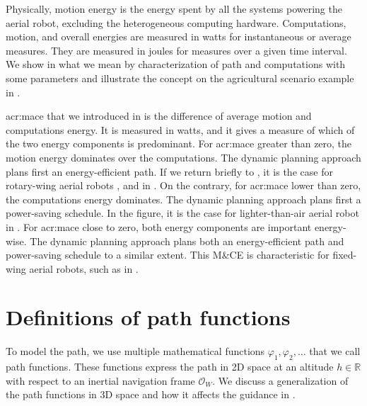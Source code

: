 Physically, motion energy is the energy spent by all the systems powering the aerial robot, excluding the heterogeneous computing hardware. Computations, motion, and overall energies are measured in watts for instantaneous or average measures. They are measured in joules for measures over a given time interval. We show in  what we mean by characterization of path and computations with some parameters and illustrate the concept on the agricultural scenario example in . 

\Gls{acr:mace} that we introduced in  is the difference of average motion and computations energy. It is measured in watts, and it gives a measure of which of the two energy components is predominant. For \Gls{acr:mace} greater than zero, the motion energy dominates over the computations. The dynamic planning approach plans first an energy-efficient path. If we return briefly to , it is the case for rotary-wing aerial robots , and  in . On the contrary, for \Gls{acr:mace} lower than zero, the computations energy dominates. The dynamic planning approach plans first a power-saving schedule. In the figure, it is the case for lighter-than-air aerial robot  in . For \Gls{acr:mace} close to zero, both energy components are important energy-wise. The dynamic planning approach plans both an energy-efficient path and power-saving schedule to a similar extent. This M\&CE is characteristic for fixed-wing aerial robots, such as  in .


\section{Definitions of path functions}
\label{sec:path-functions}

To model the path, we use multiple mathematical functions $\varphi_1,\varphi_2,\dots$ that we call path functions. These functions express the path in 2D space at an altitude $h\in\mathbb{R}$ with respect to an inertial navigation frame $\mathcal{O}_W$. We discuss a generalization of the path functions in 3D space and how it affects the guidance in . 

